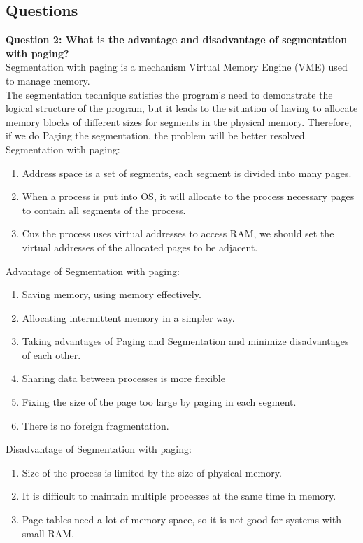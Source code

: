 \documentclass[13pt,a4paper]{article}
\begin{document}
		\subsection{Questions}
			\textbf{Question 2: What is the advantage and disadvantage of segmentation with paging?}\\
			Segmentation with paging is a mechanism Virtual Memory Engine (VME) used to manage memory. \\
			The segmentation technique satisfies the program's need to demonstrate the logical structure of the program, but it leads to the situation of having to allocate memory blocks of different sizes for segments in the physical memory. Therefore, if we do Paging the segmentation, the problem will be better resolved.\\
			Segmentation with paging:
			\begin{enumerate}[-]
				\item Address space is a set of segments, each segment is divided into many pages.
				\item When a process is put into OS, it will allocate to the process necessary pages to contain all segments of the process.
				\item Cuz the process uses virtual addresses to access RAM, we should set the virtual addresses of the allocated pages to be adjacent.
			\end{enumerate}
			Advantage of Segmentation with paging:
			\begin{enumerate}[-]
				\item Saving memory, using memory effectively.
				\item Allocating intermittent memory in a simpler way.
				\item Taking advantages of Paging and Segmentation and minimize disadvantages of each other.
				\item Sharing data between processes is more flexible
				\item Fixing the size of the page too large by paging in each segment.
				\item There is no foreign fragmentation.
			\end{enumerate}
			Disadvantage of Segmentation with paging:
			\begin{enumerate}[-]
				\item Size of the process is limited by the size of physical memory.
				\item It is difficult to maintain multiple processes at the same time in memory.
				\item Page tables need a lot of memory space, so it is not good for systems with small RAM.
			\end{enumerate}
\end{document}

